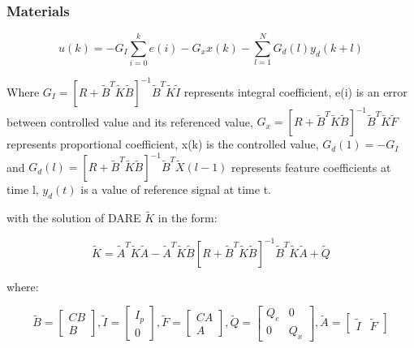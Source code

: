 \documentclass{beamer}
\begin{document}
	\begin{frame}
		\frametitle{Materials} 
		
		\begin{equation}\label{eq:pc1}
		u(k) = -G_I \sum^{k}_{i=0} e(i) - G_xx(k) - \sum^{N}_{l=1}G_d(l)y_d(k+l)
		\end{equation}
		
		Where $G_I = [R+\tilde{B}^T \tilde{K} \tilde{B}]^{-1} \tilde{B}^T \tilde{K} \tilde{I}$ represents integral coefficient, e(i) is an error between controlled value and its referenced value, $G_x = [R+\tilde{B}^T \tilde{K} \tilde{B}]^{-1} \tilde{B}^T \tilde{K} \tilde{F}$ represents proportional coefficient, x(k) is the controlled value, $G_d(1) = -G_I$ and $G_d(l) = [R+\tilde{B}^T \tilde{K} \tilde{B}]^{-1} \tilde{B}^T \tilde{X}(l-1)$ represents feature coefficients at time l, $y_d(t)$ is a value of reference signal at time t.
		
		with the solution of DARE $\tilde{K}$ in the form:
		
		\begin{equation}\label{eq:pc2}
		\tilde{K} = \tilde{A}^T\tilde{K}\tilde{A} - \tilde{A}^T \tilde{K} \tilde{B} [R + \tilde{B}^T \tilde{K} \tilde{B}]^{-1} \tilde{B}^T\tilde{K}\tilde{A} + \tilde{Q}
		\end{equation}
		
		where:
		
		\begin{equation}\label{eq:pc3}
		\tilde{B} = \begin{bmatrix} C B \\ B \end{bmatrix},
		\tilde{I} = \begin{bmatrix} I_p \\ 0 \end{bmatrix},
		\tilde{F} = \begin{bmatrix} CA \\ A \end{bmatrix},
		\tilde{Q} = \begin{bmatrix} Q_e & 0 \\ 0 & Q_x \end{bmatrix},
		\tilde{A} = \begin{bmatrix} \tilde{I} & \tilde{F} \end{bmatrix}
		\end{equation}
	\end{frame}
	
\end{document}
